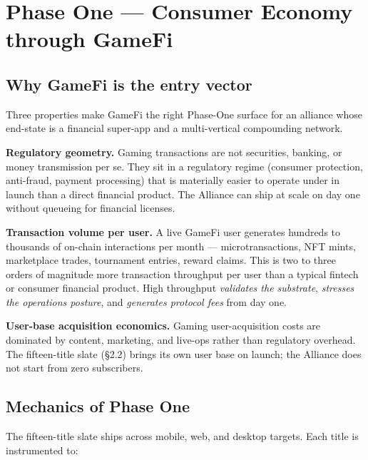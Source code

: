 \section{Phase One --- Consumer Economy through GameFi}

\subsection{Why GameFi is the entry vector}

Three properties make GameFi the right Phase-One surface for an alliance
whose end-state is a financial super-app and a multi-vertical compounding
network.

\textbf{Regulatory geometry.} Gaming transactions are not securities,
banking, or money transmission per se. They sit in a regulatory regime
(consumer protection, anti-fraud, payment processing) that is materially
easier to operate under in launch than a direct financial product. The
Alliance can ship at scale on day one without queueing for financial
licenses.

\textbf{Transaction volume per user.} A live GameFi user generates
hundreds to thousands of on-chain interactions per month --- microtransactions,
NFT mints, marketplace trades, tournament entries, reward claims. This is
two to three orders of magnitude more transaction throughput per user than
a typical fintech or consumer financial product. High throughput
\emph{validates the substrate}, \emph{stresses the operations posture},
and \emph{generates protocol fees} from day one.

\textbf{User-base acquisition economics.} Gaming user-acquisition costs
are dominated by content, marketing, and live-ops rather than regulatory
overhead. The fifteen-title slate (\S 2.2) brings its own user base on
launch; the Alliance does not start from zero subscribers.

\subsection{Mechanics of Phase One}

The fifteen-title slate ships across mobile, web, and desktop targets.
Each title is instrumented to:

